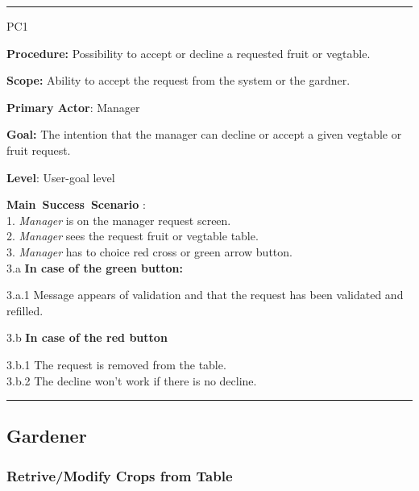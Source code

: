 \vspace{0.5cm}
\hrule
\hfill \break
\begin{lyxlist}{PC1}
\small{
\item [\textbf{Procedure:}] Possibility to accept or decline a requested fruit
or vegtable.
\item [\textbf{Scope:}] Ability to accept the request from the system or the
gardner.
\item [\textbf{Primary Actor}:] Manager
\item [\textbf{Goal:}] The intention that the manager can decline or accept a
given vegtable or fruit request.
\item [\textbf{Level}:] User-goal level
\item [\textbf{Main~Success~Scenario}]:\\
1. \emph{Manager} is on the manager request screen. \\
2. \emph{Manager} sees the request fruit or vegtable table.\\
3. \emph{Manager} has to choice red cross or green arrow button.\\
3.a \textbf{In case of the green button:}
 \begin{Tab}{2em} 3.a.1 Message appears of validation and that the request
 has been validated and refilled.\\
  \end{Tab}
3.b \textbf{In case of the red button}
\begin{Tab}{2em} 3.b.1 The request is removed from the table.\\
3.b.2 The decline won't work if there is no decline.
\end{Tab}
}
\end{lyxlist}
\hrule
\vspace{0.5cm}
\break




\subsection{Gardener}
\subsubsection{Retrive/Modify Crops from Table}

